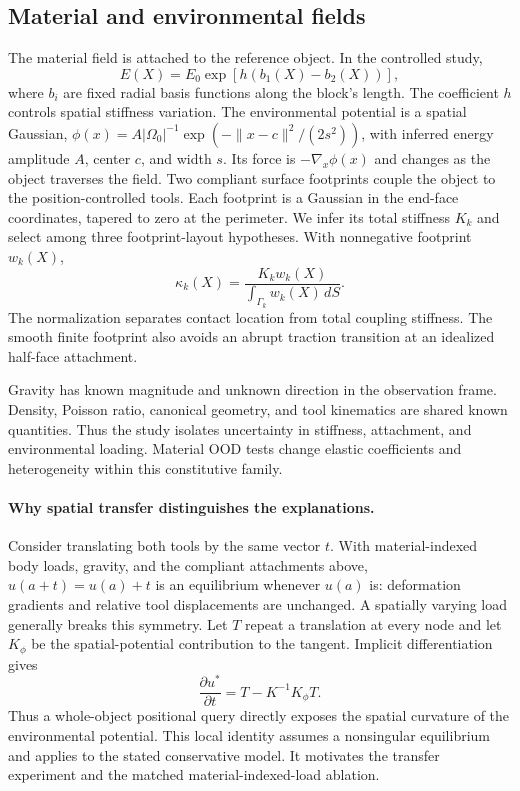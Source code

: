 \documentclass[10pt,twocolumn,letterpaper]{article}
\begin{document}
\subsection{Material and environmental fields}
The material field is attached to the reference object. In the controlled study,
\begin{equation}
 E(X)=E_0\exp\!\left[h\left(b_1(X)-b_2(X)\right)\right],
\end{equation}
where $b_i$ are fixed radial basis functions along the block's length. The coefficient $h$ controls spatial stiffness variation. The environmental potential is a spatial Gaussian, $\phi(x)=A|\Omega_0|^{-1}\exp(-\|x-c\|^2/(2s^2))$, with inferred energy amplitude $A$, center $c$, and width $s$. Its force is $-\nabla_x\phi(x)$ and changes as the object traverses the field. Two compliant surface footprints couple the object to the position-controlled tools. Each footprint is a Gaussian in the end-face coordinates, tapered to zero at the perimeter. We infer its total stiffness $K_k$ and select among three footprint-layout hypotheses. With nonnegative footprint $w_k(X)$,
\begin{equation}
 \kappa_k(X)=\frac{K_kw_k(X)}{\int_{\Gamma_k}w_k(X)\,dS}.
\end{equation}
The normalization separates contact location from total coupling stiffness. The smooth finite footprint also avoids an abrupt traction transition at an idealized half-face attachment.

Gravity has known magnitude and unknown direction in the observation frame. Density, Poisson ratio, canonical geometry, and tool kinematics are shared known quantities. Thus the study isolates uncertainty in stiffness, attachment, and environmental loading. Material OOD tests change elastic coefficients and heterogeneity within this constitutive family.

\paragraph{Why spatial transfer distinguishes the explanations.}
Consider translating both tools by the same vector $t$. With material-indexed body loads, gravity, and the compliant attachments above, $u(a+t)=u(a)+t$ is an equilibrium whenever $u(a)$ is: deformation gradients and relative tool displacements are unchanged. A spatially varying load generally breaks this symmetry. Let $T$ repeat a translation at every node and let $K_\phi$ be the spatial-potential contribution to the tangent. Implicit differentiation gives
\begin{equation}
 \frac{\partial u^*}{\partial t}=T-K^{-1}K_\phi T.
\end{equation}
Thus a whole-object positional query directly exposes the spatial curvature of the environmental potential. This local identity assumes a nonsingular equilibrium and applies to the stated conservative model. It motivates the transfer experiment and the matched material-indexed-load ablation.
\end{document}
